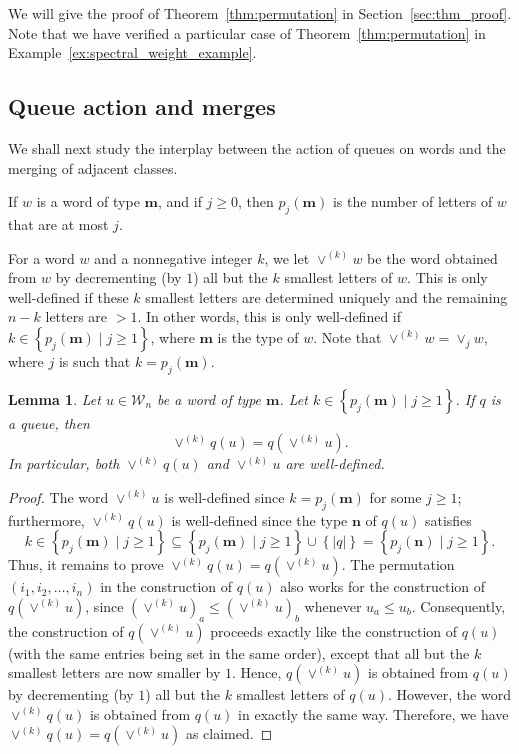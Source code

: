 \documentclass[reqno]{amsart}
\newcommand{\0}{\phantom{c}}
\newcommand{\merge}[1]{\vee_{#1}} %
\newcommand{\mm}{\mathbf{m}}
\newcommand{\nn}{\mathbf{n}}
\newcommand{\mcW}{\mathcal{W}}
\newcommand{\set}[1]{\left\{ #1 \right\}}
\newcommand{\abs}[1]{\left| #1 \right|}
\newcommand{\tup}[1]{\left( #1 \right)}
\newcommand{\defn}[1]{{\color{darkred}\emph{#1}}} %
\theoremstyle{plain}
\newtheorem{lemma}[thm]{Lemma}
\theoremstyle{definition}
\numberwithin{equation}{section}
\begin{document}
We will give the proof of Theorem~\ref{thm:permutation} in Section~\ref{sec:thm_proof}.
Note that we have verified a particular case of Theorem~\ref{thm:permutation} in Example~\ref{ex:spectral_weight_example}.


\subsection{Queue action and merges}
We shall next study the interplay between the action of queues on words and the merging of adjacent classes.

If $w$ is a word of type $\mm$, and if $j \geq 0$, then $p_j(\mm)$ is the number of letters of $w$ that are at most $j$.

For a word $w$ and a nonnegative integer $k$, we let \defn{$\vee^{(k)} w$} be the word obtained from $w$ by decrementing (by $1$) all but the $k$ smallest letters of $w$.
This is only well-defined if these $k$ smallest letters are determined uniquely and the remaining $n-k$ letters are $> 1$.
In other words, this is only well-defined if $k \in \set{ p_j(\mm) \mid j \geq 1 }$, where $\mm$ is the type of $w$.
Note that $\vee^{(k)} w = \merge{j} w$, where $j$ is such that $k = p_j(\mm)$.


\begin{lemma}
\label{lemma:queue_merge_commute}
Let $u \in \mcW_n$ be a word of type $\mm$.
Let $k \in \set{ p_j(\mm) \mid j \geq 1 }$.
If $q$ is a queue, then
\[
\vee^{(k)} q(u) = q(\vee^{(k)} u).
\]
In particular, both $\vee^{(k)} q(u)$ and $\vee^{(k)} u$ are well-defined.
\end{lemma}

\begin{proof}
The word $\vee^{(k)} u$ is well-defined since $k = p_j(\mm)$ for some $j \geq 1$;
furthermore, $\vee^{(k)} q(u)$ is well-defined since the type $\nn$ of $q(u)$
satisfies
\[
k \in \set{ p_j(\mm) \mid j \geq 1 } \subseteq \set{ p_j(\mm) \mid j \geq 1 } \cup \set{\abs{q}} = \set{ p_j(\nn) \mid j \geq 1 }.
\]
Thus, it remains to prove $\vee^{(k)} q(u) = q(\vee^{(k)} u)$.
The permutation $\tup{i_1, i_2, \dotsc, i_n}$ in the construction of $q(u)$
also works for the construction of $q(\vee^{(k)} u)$,
since $(\vee^{(k)} u)_a \leq (\vee^{(k)} u)_b$ whenever $u_a \leq u_b$.
Consequently, the construction of $q(\vee^{(k)} u)$ proceeds exactly like
the construction of $q(u)$ (with the same entries being set in the same
order), except that all but the $k$ smallest letters are now smaller by $1$.
Hence, $q(\vee^{(k)} u)$ is obtained from $q(u)$ by decrementing (by $1$)
all but the $k$ smallest letters of $q(u)$.
However, the word $\vee^{(k)} q(u)$ is obtained from $q(u)$ in exactly the same way.
Therefore, we have $\vee^{(k)} q(u) = q(\vee^{(k)} u)$ as claimed.
\end{proof}
\end{document}
